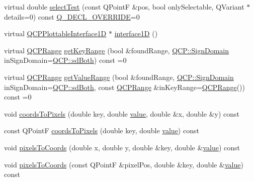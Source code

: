 \begin{DoxyCompactItemize}
\item 
virtual double \mbox{\hyperlink{class_q_c_p_abstract_plottable_addb3f5c41f007a78c3e142cc605bc712}{select\+Test}} (const Q\+PointF \&pos, bool only\+Selectable, Q\+Variant $\ast$details=0) const \mbox{\hyperlink{qcustomplot_8h_a42cc5eaeb25b85f8b52d2a4b94c56f55}{Q\+\_\+\+D\+E\+C\+L\+\_\+\+O\+V\+E\+R\+R\+I\+DE}}=0
\item 
virtual \mbox{\hyperlink{class_q_c_p_plottable_interface1_d}{Q\+C\+P\+Plottable\+Interface1D}} $\ast$ \mbox{\hyperlink{class_q_c_p_abstract_plottable_a81fd9fd5c4f429c074785e2eb238a8e7}{interface1D}} ()
\item 
virtual \mbox{\hyperlink{class_q_c_p_range}{Q\+C\+P\+Range}} \mbox{\hyperlink{class_q_c_p_abstract_plottable_a4da16d3cd4b509e1104a9b0275623c96}{get\+Key\+Range}} (bool \&found\+Range, \mbox{\hyperlink{namespace_q_c_p_afd50e7cf431af385614987d8553ff8a9}{Q\+C\+P\+::\+Sign\+Domain}} in\+Sign\+Domain=\mbox{\hyperlink{namespace_q_c_p_afd50e7cf431af385614987d8553ff8a9aa38352ef02d51ddfa4399d9551566e24}{Q\+C\+P\+::sd\+Both}}) const =0
\item 
virtual \mbox{\hyperlink{class_q_c_p_range}{Q\+C\+P\+Range}} \mbox{\hyperlink{class_q_c_p_abstract_plottable_a4de773988b21ed090fddd27c6a3a3dcb}{get\+Value\+Range}} (bool \&found\+Range, \mbox{\hyperlink{namespace_q_c_p_afd50e7cf431af385614987d8553ff8a9}{Q\+C\+P\+::\+Sign\+Domain}} in\+Sign\+Domain=\mbox{\hyperlink{namespace_q_c_p_afd50e7cf431af385614987d8553ff8a9aa38352ef02d51ddfa4399d9551566e24}{Q\+C\+P\+::sd\+Both}}, const \mbox{\hyperlink{class_q_c_p_range}{Q\+C\+P\+Range}} \&in\+Key\+Range=\mbox{\hyperlink{class_q_c_p_range}{Q\+C\+P\+Range}}()) const =0
\item 
void \mbox{\hyperlink{class_q_c_p_abstract_plottable_a7ad84a36472441cf1f555c5683d0da93}{coords\+To\+Pixels}} (double key, double \mbox{\hyperlink{diffusion_8cpp_a4b41795815d9f3d03abfc739e666d5da}{value}}, double \&x, double \&y) const
\item 
const Q\+PointF \mbox{\hyperlink{class_q_c_p_abstract_plottable_a5acb50ae984eef09a7ab92315d2ad708}{coords\+To\+Pixels}} (double key, double \mbox{\hyperlink{diffusion_8cpp_a4b41795815d9f3d03abfc739e666d5da}{value}}) const
\item 
void \mbox{\hyperlink{class_q_c_p_abstract_plottable_a3903c1120ab5c27e7fa46b597ef267bd}{pixels\+To\+Coords}} (double x, double y, double \&key, double \&\mbox{\hyperlink{diffusion_8cpp_a4b41795815d9f3d03abfc739e666d5da}{value}}) const
\item 
void \mbox{\hyperlink{class_q_c_p_abstract_plottable_a28d32c0062b9450847851ffdee1c5f69}{pixels\+To\+Coords}} (const Q\+PointF \&pixel\+Pos, double \&key, double \&\mbox{\hyperlink{diffusion_8cpp_a4b41795815d9f3d03abfc739e666d5da}{value}}) const

\end{DoxyCompactItemize}
